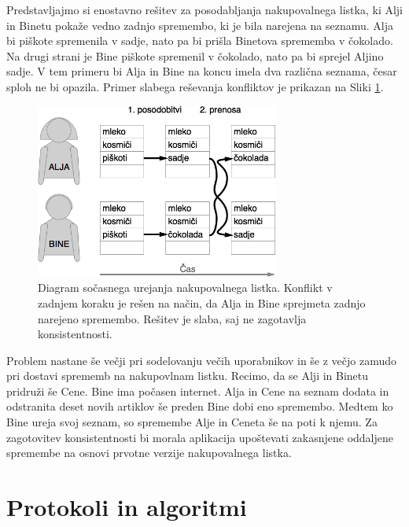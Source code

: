 \documentclass[a4paper, 12pt, twoside]{book}
\begin{document}
\pagebreak

Predstavljajmo si enostavno rešitev za posodabljanja nakupovalnega listka, ki Alji in Binetu pokaže vedno zadnjo spremembo, ki je bila narejena na seznamu. Alja bi piškote spremenila v sadje, nato pa bi prišla Binetova sprememba v čokolado. Na drugi strani je Bine piškote spremenil v čokolado, nato pa bi sprejel Aljino sadje. V tem primeru bi Alja in Bine na koncu imela dva različna seznama, česar sploh ne bi opazila. Primer slabega reševanja konfliktov je prikazan na Sliki \ref{problem3}.

\begin{figure}[placement h]
\begin{center}
\includegraphics[width=8cm]{problem3.png}
\end{center}
\caption{Diagram sočasnega urejanja nakupovalnega listka. Konflikt v zadnjem koraku je rešen na način, da Alja in Bine sprejmeta zadnjo narejeno spremembo. Rešitev je slaba, saj ne zagotavlja konsistentnosti. }
\label{problem3}
\end{figure}

Problem nastane še večji pri sodelovanju večih uporabnikov in še z večjo zamudo pri dostavi sprememb na nakupovlnam listku. Recimo, da se Alji in Binetu pridruži še Cene. Bine ima počasen internet. Alja in Cene na seznam dodata in odstranita deset novih artiklov še preden Bine dobi eno spremembo. Medtem ko Bine ureja svoj seznam, so spremembe Alje in Ceneta še na poti k njemu. Za zagotovitev konsistentnosti bi morala aplikacija upoštevati zakasnjene oddaljene spremembe na osnovi prvotne verzije nakupovalnega listka.

\chapter{Protokoli in algoritmi}
\end{document}
